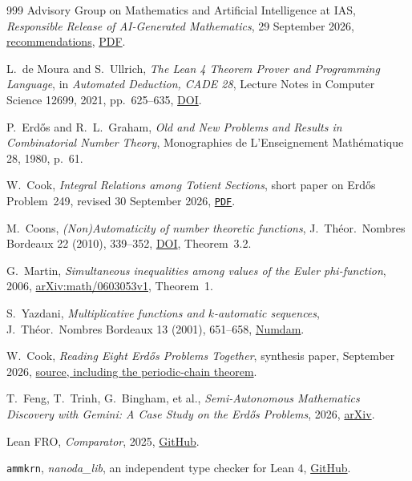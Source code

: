 \documentclass[10pt]{article}
\newcommand{\repobase}{https://github.com/wcook04/plectis-erdos}
\newcommand{\repolink}[2]{\href{\repobase/blob/992cf60a27efd8c34f437e347c413bb781d75c32/#1}{\texttt{#2}}}
\begin{document}
\begin{thebibliography}{999}
 Advisory Group on Mathematics and Artificial Intelligence
at IAS, \emph{Responsible Release of AI-Generated Mathematics},
29 September 2026,
\href{https://agmai.org/general-sep29/}{recommendations},
\href{https://agmai.org/wp-content/uploads/2026/09/recommendations.pdf}{PDF}.

 L.~de Moura and S.~Ullrich, \emph{The Lean 4 Theorem Prover
and Programming Language}, in \emph{Automated Deduction, CADE 28}, Lecture
Notes in Computer Science 12699, 2021, pp.~625--635,
\href{https://doi.org/10.1007/978-3-030-79876-5_37}{DOI}.

 P.~Erd\H{o}s and R.~L.~Graham, \emph{Old and New
Problems and Results in Combinatorial Number Theory}, Monographies de
L'Enseignement Math\'ematique 28, 1980, p.~61.

 W.~Cook, \emph{Integral Relations among Totient Sections}, short paper on Erd\H{o}s Problem~249, revised
30 September 2026,
\repolink{paper/249/erdos-249-binary-totient-series.pdf}{PDF}.

 M.~Coons, \emph{(Non)Automaticity of number theoretic
functions}, J.\ Th\'eor.\ Nombres Bordeaux 22 (2010), 339--352,
\href{https://doi.org/10.5802/jtnb.718}{DOI}, Theorem~3.2.

 G.~Martin, \emph{Simultaneous inequalities among values of
the Euler phi-function}, 2006,
\href{https://arxiv.org/abs/math/0603053v1}{arXiv:math/0603053v1}, Theorem~1.

 S.~Yazdani, \emph{Multiplicative functions and $k$-automatic
sequences}, J.\ Th\'eor.\ Nombres Bordeaux 13 (2001), 651--658,
\href{https://www.numdam.org/item/JTNB_2001__13_2_651_0/}{Numdam}.

 W.~Cook, \emph{Reading Eight Erd\H{o}s Problems
Together}, synthesis paper, September 2026,
\href{\repobase/blob/af1462ce/paper/synthesis/optimal-sparse-perturbations.tex}{source, including the periodic-chain theorem}.

 T.~Feng, T.~Trinh, G.~Bingham, et al., \emph{Semi-Autonomous
Mathematics Discovery with Gemini: A Case Study on the Erd\H{o}s Problems},
2026, \href{https://doi.org/10.48550/arXiv.2601.22401}{arXiv}.

 Lean FRO, \emph{Comparator}, 2025,
\href{https://github.com/leanprover/comparator}{GitHub}.

 \texttt{ammkrn}, \emph{nanoda\_lib}, an independent type
checker for Lean 4, \href{https://github.com/ammkrn/nanoda_lib}{GitHub}.


\end{thebibliography}
\end{document}
